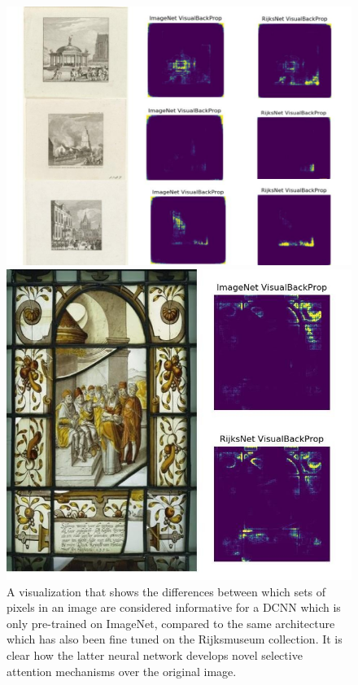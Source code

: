 \documentclass[runningheads]{llncs}
\begin{document}
\begin{figure}[ht!]
    \begin{minipage}{.5\textwidth}
        \centering
        \includegraphics[width=1\linewidth]{./images/selective_attention.jpg}
    \end{minipage}%
        \begin{minipage}{.5\textwidth}
        \centering
        \includegraphics[width=0.85\linewidth]{./images/type.jpg}
	\end{minipage}
    \caption{A visualization that shows the differences between which sets of pixels in an image are considered informative for a DCNN which is only pre-trained on ImageNet, compared to the same architecture which has also been fine tuned on the Rijksmuseum collection. It is clear how the latter neural network develops novel selective attention mechanisms over the original image.}
    \label{fig:saliency_maps}
\end{figure}
\end{document}
